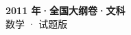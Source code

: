 \documentclass[zihao=-4, a4paper]{ctexart}
\begin{document}
\begin{center}
  {\Large\bfseries 2011 年·全国大纲卷·文科}\\[4pt]
  {\large 数学 · 试题版}
\end{center}
\medskip
{}

\end{document}

